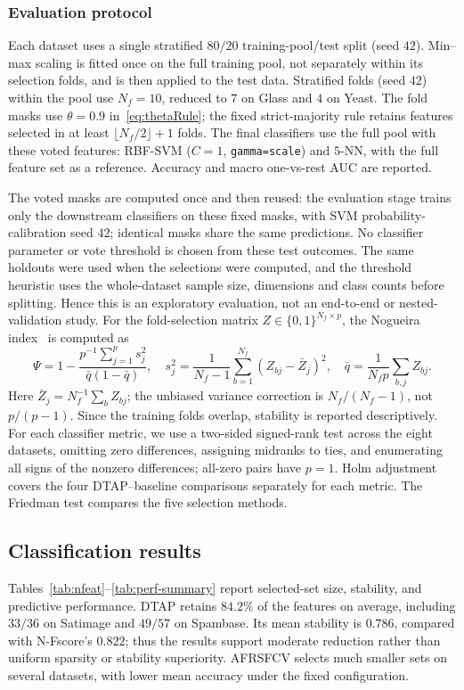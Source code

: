 \documentclass[]{interact}
\theoremstyle{plain}
\theoremstyle{definition}
\theoremstyle{remark}
\begin{document}
\subsubsection{Evaluation protocol}\label{sssec:protocol}
Each dataset uses a single stratified $80/20$ training-pool/test split
(seed $42$). Min--max scaling is fitted once on the full training pool, not
separately within its selection folds, and is then applied to the test data.
Stratified folds (seed $42$) within the pool use $N_f=10$, reduced to $7$ on Glass
and $4$ on Yeast. The fold masks use $\theta=0.9$ in~\eqref{eq:thetaRule};
the fixed strict-majority rule retains features selected in at least
$\lfloor N_f/2\rfloor+1$ folds. The final classifiers use the full pool with these
voted features: RBF-SVM ($C=1$, \texttt{gamma=scale}) and $5$-NN, with the full
feature set as a reference. Accuracy and macro one-vs-rest AUC are reported.

The voted masks are computed once and then reused: the evaluation stage trains
only the downstream classifiers on these fixed masks, with SVM probability-calibration
seed $42$; identical masks share the same predictions. No classifier parameter or vote threshold
is chosen from these test outcomes. The same holdouts were used when the selections
were computed, and the threshold heuristic uses the whole-dataset sample size, dimensions
and class counts before splitting. Hence this is an exploratory evaluation,
not an end-to-end or nested-validation study.
For the fold-selection matrix $Z\in\{0,1\}^{N_f\times p}$, the Nogueira index~\citep{nogueira2018}
is computed as
\[
\Psi=1-\frac{p^{-1}\sum_{j=1}^{p}s_j^2}{\bar q(1-\bar q)},\quad
s_j^2=\frac{1}{N_f-1}\sum_{b=1}^{N_f}(Z_{bj}-\bar Z_j)^2,\quad
\bar q=\frac{1}{N_f p}\sum_{b,j}Z_{bj}.
\]
Here $\bar Z_j=N_f^{-1}\sum_b Z_{bj}$; the unbiased variance correction is
$N_f/(N_f-1)$, not $p/(p-1)$.
Since the training folds overlap, stability is reported descriptively.
For each classifier metric, we use a two-sided signed-rank test across the
eight datasets, omitting zero differences, assigning midranks to ties, and
enumerating all signs of the nonzero differences; all-zero pairs have $p=1$.
Holm adjustment covers the four DTAP--baseline comparisons separately for
each metric. The Friedman test compares the five selection methods.

\subsection{Classification results}\label{ssec:results}
Tables~\ref{tab:nfeat}--\ref{tab:perf-summary} report selected-set size,
stability, and predictive performance. DTAP retains $84.2\%$ of the features
on average, including $33/36$ on Satimage and $49/57$ on Spambase.
Its mean stability is $0.786$, compared with N-Fscore's $0.822$;
thus the results support moderate reduction rather than uniform sparsity
or stability superiority. AFRSFCV selects much smaller sets on several datasets,
with lower mean accuracy under the fixed configuration.
\end{document}
